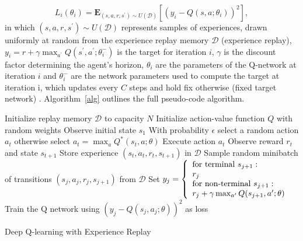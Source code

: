 \documentclass{article}
\begin{document}
\begin{equation}
L_i(\theta_i) = \mathbf{E}_{(s,a,r,s^{\prime}) \sim U(\mathcal{D})} \left[\left(y_i - Q(s,a; \theta_i)\right)^2  \right], 
\end{equation}
in which $(s,a,r,s^{\prime}) \sim U(\mathcal{D})$ represents samples of experiences, drawn uniformly at random from the experience replay memory $\mathcal{D}$  (experience replay), $y_i = r + \gamma \max_{a^{\prime}} Q(s^{\prime},a^{\prime}; \theta_{i}^{-})$ is the target for iteration $i$, $\gamma$ is the discount factor determining the agent's horizon, $\theta_{i}$ are the parameters of the Q-network at iteration $i$ and $\theta_{i}^{-}$ are the network parameters used to compute the target at iteration i, which updates every $C$ steps and hold fix otherwise (fixed target network) \cite{Mnih.2015}. Algorithm~\ref{alg} outlines the full pseudo-code algorithm.

\begin{algorithm}[t]
	\begin{algorithmic}
		\State Initialize replay memory $\mathcal{D}$ to capacity $N$
		\State Initialize action-value function $Q$ with random weights
		\State Observe initial state $s_1$ 
		\State With probability $\epsilon$ select a random action $a_t$
		\State otherwise select $a_t = \max_{a} Q^*(s_t, a; \theta)$
		\State Execute action $a_t$ 
		\State Observe reward $r_t$ and state $s_{t+1}$
		\State Store experience $\left(s_t, a_t, r_t, s_{t+1}\right)$ in $\mathcal{D}$
		\State Sample random minibatch of transitions $\left(s_j,a_j,r_j,s_{j+1}\right)$ from $\mathcal{D}$
		\State Set
		$y_j =
		\left\{
		\begin{array}{l l l l}
		\text{for terminal } s_{j+1}: \\
		r_j  \\
		\text{for non-terminal } s_{j+1}: \\
		r_j + \gamma \max_{a'} Q(s_{j+1}, a'; \theta)
		\end{array} \right.$
		\State Train the Q network using $\left(y_j - Q(s_j, a_j; \theta) \right)^2$ as loss
		\EndFor
		\EndFor
	\end{algorithmic}
	\caption{Deep Q-learning with Experience Replay}
	\label{alg}
\end{algorithm}
 
\end{document}
